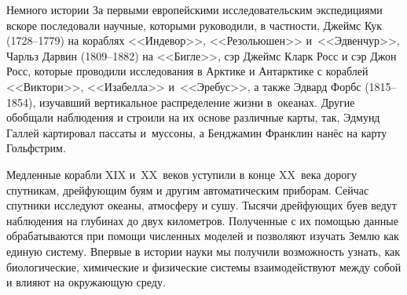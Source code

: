 \begin{chapter}{Немного истории}
За первыми европейскими исследовательским экспедициями вскоре
последовали научные, которыми руководили, в частности,
Джеймс Кук (1728--1779) на кораблях <<Индевор>>, <<Резольюшен>> 
и~<<Эдвенчур>>,
Чарльз Дарвин (1809--1882) на <<Бигле>>, сэр Джеймс Кларк Росс
и сэр Джон Росс, которые проводили исследования в Арктике 
и Антарктике с кораблей <<Виктори>>, <<Изабелла>> и~<<Эребус>>, а также 
Эдвард Форбс (1815--1854), изучавший вертикальное распределение жизни 
в~океанах. Другие обобщали наблюдения и строили на их основе различные карты,
так, Эдмунд Галлей картировал пассаты и~муссоны, 
а Бенджамин Франклин нанёс на карту Гольфстрим.
%

Медленные корабли XIX и~XX~веков уступили в конце XX~века дорогу
спутникам, дрейфующим буям и другим автоматическим приборам. 
Сейчас спутники исследуют океаны, атмосферу и сушу. Тысячи дрейфующих буев
ведут наблюдения на глубинах до двух километров. Полученные с их помощью
данные обрабатываются при помощи численных моделей и позволяют изучать Землю как
единую систему. Впервые в истории науки мы получили возможность узнать, 
как биологические, химические и физические системы взаимодействуют между 
собой и влияют на окружающую среду.
%


\end{chapter}
